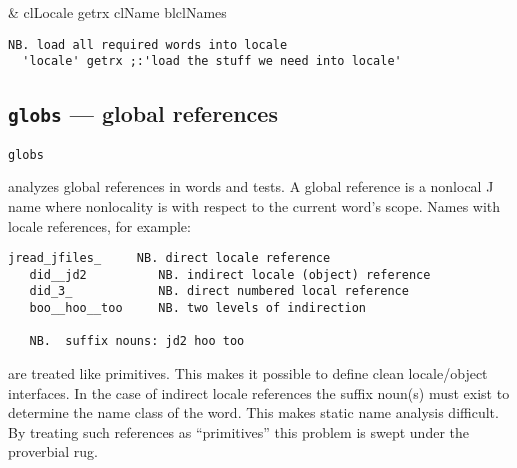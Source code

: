 \begin{wordhead}
\dyad & clLocale getrx clName \argsep blclNames \\
\end{wordhead}
\begin{lstlisting}[frame=single,framerule=0pt] 
  NB. load all required words into locale
  'locale' getrx ;:'load the stuff we need into locale' 
\end{lstlisting}


\subsection{\texttt{globs} --- global references}\label{ss:globs}

\hypertarget{il:globs}{\texttt{globs}} analyzes 
global references 
in words and tests. A global reference is a 
nonlocal J name where nonlocality is with respect to the current word's scope. 
Names with locale references, for example: 

\begin{lstlisting}[frame=single,framerule=0pt] 
   jread_jfiles_     NB. direct locale reference
   did__jd2          NB. indirect locale (object) reference 
   did_3_            NB. direct numbered local reference
   boo__hoo__too     NB. two levels of indirection 
   
   NB.  suffix nouns: jd2 hoo too
\end{lstlisting}
  
 
\noindent are treated like primitives. This makes it possible to define clean locale/object 
interfaces. In the case of indirect locale references the suffix noun(s) must exist 
to determine the name class of the word. This makes static name analysis difficult. 
By treating such references as ``primitives'' this problem is swept 
under the proverbial rug. 

